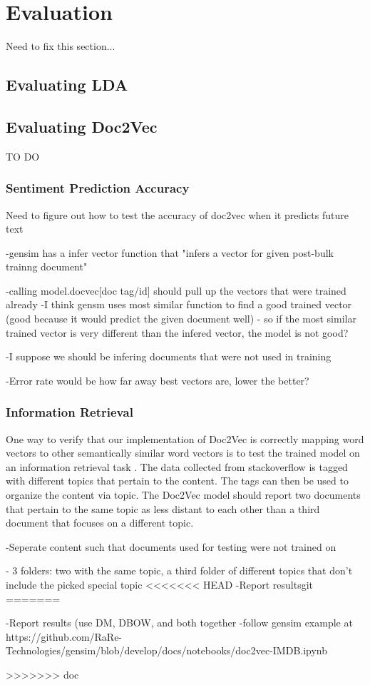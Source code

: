 
\section{Evaluation}
Need to fix this section...

\subsection{Evaluating LDA}

\subsection{Evaluating Doc2Vec}
TO DO

\subsubsection{Sentiment Prediction Accuracy}
Need to figure out how to test the accuracy of doc2vec when it predicts future text

-gensim has a infer vector function that "infers a vector for given post-bulk trainng document"

-calling model.docvec[doc tag/id] should pull up the vectors that were trained already
	-I think gensm uses most similar function to find a good trained vector (good because it would predict the given document well)
	- so if the most similar trained vector is very different than the infered vector, the model is not good?

-I suppose we should be infering documents that were not used in training

-Error rate would be how far away best vectors are, lower the better?

\subsubsection{Information Retrieval}

One way to verify that our implementation of Doc2Vec is correctly mapping word vectors to other semantically similar word vectors is to test the trained model on an information retrieval task . \cite{RefWorks:doc:5a6e5746e4b0d609eec798d7} The data collected from stackoverflow is tagged with different topics that pertain to the content. The tags can then be used to organize the content via topic. The Doc2Vec model should report two documents that pertain to the same topic as less distant to each other than a third document that focuses on a different topic.

-Seperate content such that documents used for testing were not trained on

- 3 folders: two with the same topic, a third folder of different topics that don't include the picked special topic
<<<<<<< HEAD
-Report resultsgit
=======

-Report results (use DM, DBOW, and both together -follow gensim example at https://github.com/RaRe-Technologies/gensim/blob/develop/docs/notebooks/doc2vec-IMDB.ipynb 

>>>>>>> doc
